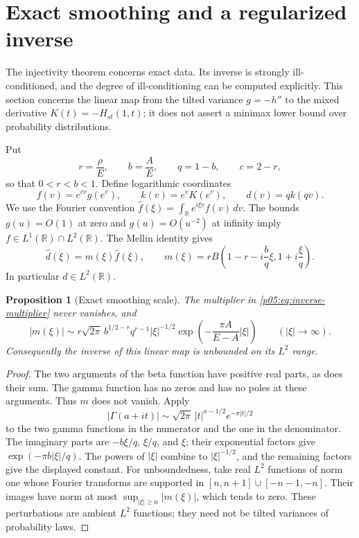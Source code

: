\documentclass[11pt,letterpaper]{article}
\newtheorem{proposition}[theorem]{Proposition}
\theoremstyle{definition}
\theoremstyle{remark}
\newcommand{\1}{\mathbf 1}
\begin{document}
\section{Exact smoothing and a regularized inverse}
\label{p05:sec:inverse-stability}

The injectivity theorem concerns exact data.  Its inverse is strongly
ill-conditioned, and the degree of ill-conditioning can be computed
explicitly.  This section concerns the linear map from the tilted variance
$g=-h''$ to the mixed derivative $K(t)=-H_{st}(1,t)$; it does not assert a
minimax lower bound over probability distributions.

Put
\[
 r=\frac{\rho}{E},\qquad b=\frac{A}{E},\qquad q=1-b,
 \qquad c=2-r,
\]
so that $0<r<b<1$.  Define logarithmic coordinates
\[
 f(v)=e^{cv}g(e^v),\qquad k(v)=e^vK(e^v),
 \qquad d(v)=qk(qv).
\]
We use the Fourier convention
$\widehat f(\xi)=\int_{\mathbb R}e^{i\xi v}f(v)\,dv$.
The bounds $g(u)=O(1)$ at zero and $g(u)=O(u^{-2})$ at infinity
imply $f\in L^1(\mathbb R)\cap L^2(\mathbb R)$.  The Mellin identity gives
\begin{equation}\label{p05:eq:inverse-multiplier}
 \widehat d(\xi)=m(\xi)\widehat f(\xi),\qquad
 m(\xi)=r B\!\left(1-r-i\frac{b}{q}\xi,
                         1+i\frac{\xi}{q}\right).
\end{equation}
In particular $d\in L^2(\mathbb R)$.

\begin{proposition}[Exact smoothing scale]\label{p05:prop:inverse-smoothing}
The multiplier in \eqref{p05:eq:inverse-multiplier} never vanishes, and
\begin{equation}\label{p05:eq:inverse-multiplier-asymptotic}
 |m(\xi)|\sim
 r\sqrt{2\pi}\,b^{1/2-r}q^{r-1}
 |\xi|^{-1/2}
 \exp\!\left(-\frac{\pi A}{E-A}|\xi|\right)
 \qquad (|\xi|\longrightarrow\infty).
\end{equation}
Consequently the inverse of this linear map is unbounded on its
$L^2$ range.
\end{proposition}

\begin{proof}
The two arguments of the beta function have positive real parts, as does
their sum.  The gamma function has no zeros and has no poles at these
arguments.  Thus $m$ does not vanish.  Apply
\[
 |\Gamma(a+it)|\sim\sqrt{2\pi}\,|t|^{a-1/2}e^{-\pi|t|/2}
\]
to the two gamma functions in the numerator and the one in the
denominator.  The imaginary parts are $-b\xi/q$, $\xi/q$, and $\xi$;
their exponential factors give
$\exp(-\pi b|\xi|/q)$.  The powers of $|\xi|$ combine to
$|\xi|^{-1/2}$, and the remaining factors give the displayed constant.
For unboundedness, take real $L^2$ functions of norm one whose Fourier
transforms are supported in $[n,n+1]\cup[-n-1,-n]$.  Their images have
norm at most $\sup_{|\xi|\ge n}|m(\xi)|$, which tends to zero.
These perturbations are ambient $L^2$ functions; they need not be tilted
variances of probability laws.
\end{proof}
\end{document}
